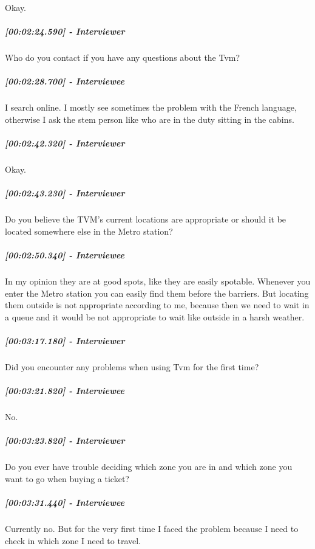 \documentclass[a4paper,12pt]{article}
\begin{document}
Okay.

\hypertarget{interviewer-23}{%
\subparagraph{{[}00:02:24.590{]} - Interviewer}\label{interviewer-23}}

Who do you contact if you have any questions about the Tvm?

\hypertarget{interviewee-14}{%
\subparagraph{{[}00:02:28.700{]} - Interviewee}\label{interviewee-14}}

I search online. I mostly see sometimes the problem with the French
language, otherwise I ask the stem person like who are in the duty
sitting in the cabins.

\hypertarget{interviewer-24}{%
\subparagraph{{[}00:02:42.320{]} - Interviewer}\label{interviewer-24}}

Okay.

\hypertarget{interviewer-25}{%
\subparagraph{{[}00:02:43.230{]} - Interviewer}\label{interviewer-25}}

Do you believe the TVM's current locations are appropriate or should it
be located somewhere else in the Metro station?

\hypertarget{interviewee-15}{%
\subparagraph{{[}00:02:50.340{]} - Interviewee}\label{interviewee-15}}

In my opinion they are at good spots, like they are easily spotable.
Whenever you enter the Metro station you can easily find them before the
barriers. But locating them outside is not appropriate according to me,
because then we need to wait in a queue and it would be not appropriate
to wait like outside in a harsh weather.

\hypertarget{interviewer-26}{%
\subparagraph{{[}00:03:17.180{]} - Interviewer}\label{interviewer-26}}

Did you encounter any problems when using Tvm for the first time?

\hypertarget{interviewee-16}{%
\subparagraph{{[}00:03:21.820{]} - Interviewee}\label{interviewee-16}}

No.

\hypertarget{interviewer-27}{%
\subparagraph{{[}00:03:23.820{]} - Interviewer}\label{interviewer-27}}

Do you ever have trouble deciding which zone you are in and which zone
you want to go when buying a ticket?

\hypertarget{interviewee-17}{%
\subparagraph{{[}00:03:31.440{]} - Interviewee}\label{interviewee-17}}

Currently no. But for the very first time I faced the problem because I
need to check in which zone I need to travel.
\end{document}
